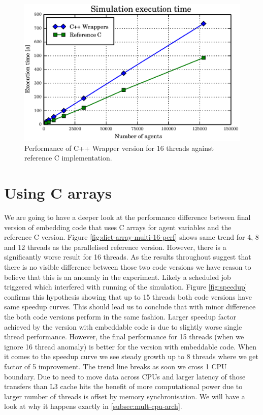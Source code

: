 \documentclass[12pt, a4paper]{report}
\begin{document}
\begin{figure}[H]
  \begin{center}
    \includegraphics[width=\columnwidth]{graphs/gil-free-16-ref-perf-comp.eps}
    \caption{Performance of C++ Wrapper version for 16 threads against reference C
      implementation.}
    \label{fig:gil-free-16-ref-perf-comp}
  \end{center}
\end{figure}

\section{Using C arrays}\label{sec:array-use}
We are going to have a deeper look at the performance difference between final
version of embedding code that uses C arrays for agent variables and the reference
C version. Figure \ref{fig:dict-array-multi-16-perf} shows same trend for
4, 8 and 12 threads as the parallelised reference version. However, there is
a significantly worse result for 16 threads. As the results throughout suggest
that there is no visible difference between those two code versions we have
reason to believe that this is an anomaly in the experiment. Likely a scheduled
job triggered which interfered with running of the simulation. Figure \ref{fig:speedup}
confirms this hypothesis showing that up to 15 threads both code versions have
same speedup curves. This should lead us to conclude that with minor difference the
both code versions perform in the same fashion. Larger speedup factor achieved
by the version with embeddable code is due to slightly worse single thread performance.
However, the final performance for 15 threads (when we ignore 16 thread anomaly) is better
for the version with embeddable code. When it comes to the speedup curve we see steady
growth up to 8 threads where we get factor of 5 improvement. The trend line breaks as
soon we cross 1 CPU boundary. Due to need to move data across CPUs and larger latency
of those transfers than L3 cache hits the benefit of more computational power due to
larger number of threads is offset by memory synchronisation. We will have a look
at why it happens exactly in \ref{subsec:mult-cpu-arch}.
\end{document}
